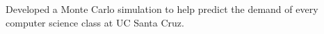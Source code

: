 \documentclass[letterpaper]{deedy-resume} %
\begin{document}
\begin{minipage}[t]{0.66\textwidth}
\sectionspace

\begin{tightitemize}
	\item Developed a Monte Carlo simulation to help predict the demand of every computer science class at UC Santa Cruz. 
\end{tightitemize}




\end{minipage} %
\end{document}
